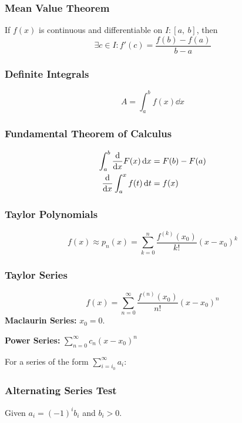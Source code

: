 \documentclass{article}
\begin{document}
\begin{multicols}{3}
    \subsubsection*{Mean Value Theorem}
    If $f(x)$ is continuous and differentiable on $I:\left[ a,\:b \right]$, then
    \begin{equation*}
        \exists c\in I:f'(c)=\frac{f(b)-f(a)}{b-a}
    \end{equation*}
    \subsubsection*{Definite Integrals}
    \begin{equation*}
        A = \int_a^b f(x) \dd{x}
    \end{equation*}
    \subsubsection*{Fundamental Theorem of Calculus}
    \begin{align*}
        \int_a^b \dv{x}F(x) \dd{x} & = F(b) - F(a) \\
        \dv{x}\int_a^x f(t) \dd{t} & = f(x)
    \end{align*}
    \subsubsection*{Taylor Polynomials}
    \begin{equation*}
        f(x) \approx p_n(x) = \sum_{k=0}^n \frac{f^{\left( k \right)}(x_0)}{k!} \left( x-x_0 \right)^k
    \end{equation*}
    \subsubsection*{Taylor Series}
    \begin{equation*}
        f(x) = \sum_{n=0}^{\infty} \frac{f^{\left( n \right)}(x_0)}{n!}\left( x-x_0 \right)^n
    \end{equation*}
    \textbf{Maclaurin Series:} $x_0 = 0$.

    \textbf{Power Series:} $\sum_{n=0}^{\infty} c_n\left( x-x_0 \right)^n$

    For a series of the form $\displaystyle\sum_{i=i_0}^\infty a_i$:
    \subsubsection*{Alternating Series Test}
    Given $a_i = \left( -1 \right)^i b_i$ and $b_i>0$.


\end{multicols}
\end{document}
